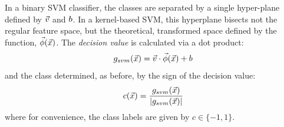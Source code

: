 In a binary SVM classifier, the classes are separated by a single hyper-plane
defined by $\vec v$ and $b$.
In a kernel-based SVM, this hyperplane bisects not the regular feature
space, but the theoretical, transformed space defined by the function,
$\vec\phi(\vec {x})$.
The {\it decision value} is calculated via a dot product:
\begin{equation}
	g_{svm}(\vec {x})=\vec v \cdot \vec\phi(\vec {x}) + b
	\label{decision_function0}
\end{equation}
and the class determined, as before, by the sign of the decision value:
\begin{equation}
	c(\vec {x}) = \frac{g_{svm}(\vec {x})}{|g_{svm}(\vec {x})|}
	\label{class_value}
\end{equation}
where for convenience, the class labels are given by $c \in \lbrace -1, 1 \rbrace$.

